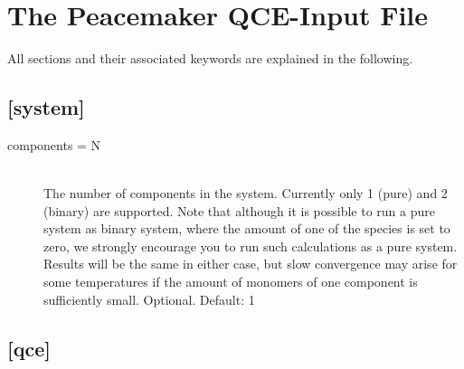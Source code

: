 \documentclass{scrartcl}
\begin{document}
\section{The Peacemaker QCE-Input File}
\label{sec:input}

All sections and their associated keywords are explained in the following.

\subsection*{[system]}
\vspace{-0.3cm}

\begin{description}
    \item[components = N] \hfill \\
        The number of components in the system.
        Currently only 1 (pure) and 2 (binary) are supported.
        Note that although it is possible to run a pure system as binary system, where the amount of 
        one of the species is set to zero, we strongly encourage you to run such calculations as a pure system.
        Results will be the same in either case, but slow convergence may arise for some temperatures 
        if the amount of monomers of one component is sufficiently small.
        Optional. Default: 1
\end{description}

\subsection*{[qce]}
\vspace{-0.3cm}
\end{document}
